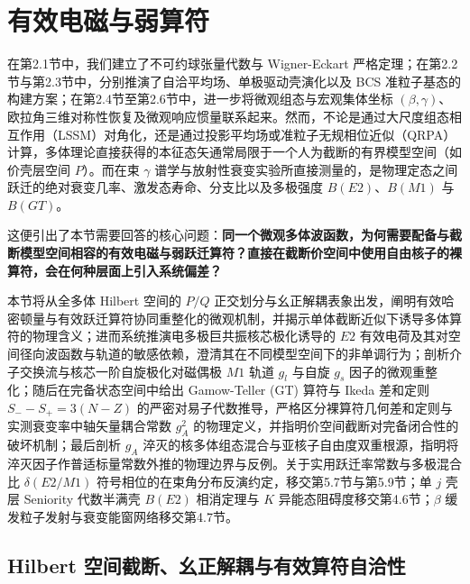 \section{有效电磁与弱算符}\label{sec:2-7}

在第2.1节中，我们建立了不可约球张量代数与 Wigner-Eckart 严格定理；在第2.2节与第2.3节中，分别推演了自洽平均场、单极驱动壳演化以及 BCS 准粒子基态的构建方案；在第2.4节至第2.6节中，进一步将微观组态与宏观集体坐标 $(\beta, \gamma)$、欧拉角三维对称性恢复及微观响应惯量联系起来。然而，不论是通过大尺度组态相互作用（LSSM）对角化，还是通过投影平均场或准粒子无规相位近似（QRPA）计算，多体理论直接获得的本征态矢通常局限于一个人为截断的有界模型空间（如价壳层空间 $P$）。而在束 $\gamma$ 谱学与放射性衰变实验所直接测量的，是物理定态之间跃迁的绝对衰变几率、激发态寿命、分支比以及多极强度 $B(E2)$、$B(M1)$ 与 $B(GT)$。

这便引出了本节需要回答的核心问题：\textbf{同一个微观多体波函数，为何需要配备与截断模型空间相容的有效电磁与弱跃迁算符？直接在截断价空间中使用自由核子的裸算符，会在何种层面上引入系统偏差？}

本节将从全多体 Hilbert 空间的 $P/Q$ 正交划分与幺正解耦表象出发，阐明有效哈密顿量与有效跃迁算符协同重整化的微观机制，并揭示单体截断近似下诱导多体算符的物理含义；进而系统推演电多极巨共振核芯极化诱导的 $E2$ 有效电荷及其对空间径向波函数与轨道的敏感依赖，澄清其在不同模型空间下的非单调行为；剖析介子交换流与核芯一阶自旋极化对磁偶极 $M1$ 轨道 $g_l$ 与自旋 $g_s$ 因子的微观重整化；随后在完备状态空间中给出 Gamow-Teller (GT) 算符与 Ikeda 差和定则 $S_- - S_+ = 3(N-Z)$ 的严密对易子代数推导，严格区分裸算符几何差和定则与实测衰变率中轴矢量耦合常数 $g_A^2$ 的物理定义，并指明价空间截断对完备闭合性的破坏机制；最后剖析 $g_A$ 淬灭的核多体组态混合与亚核子自由度双重根源，指明将淬灭因子作普适标量常数外推的物理边界与反例。关于实用跃迁率常数与多极混合比 $\delta(E2/M1)$ 符号相位的在束角分布反演约定，移交第5.7节与第5.9节；单 $j$ 壳层 Seniority 代数半满壳 $B(E2)$ 相消定理与 $K$ 异能态阻碍度移交第4.6节；$\beta$ 缓发粒子发射与衰变能窗网络移交第4.7节。

\subsection{Hilbert 空间截断、幺正解耦与有效算符自洽性}\label{sec:2-7-1}


